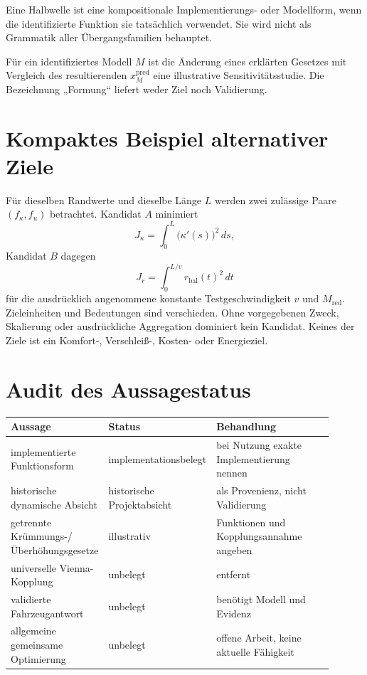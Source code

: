 \begin{definition}[Halbwelleninterpretation]
\label{def:half-wave-interpretation}
Eine Halbwelle ist eine kompositionale Implementierungs- oder Modellform,
wenn die identifizierte Funktion sie tatsächlich verwendet. Sie wird nicht
als Grammatik aller Übergangsfamilien behauptet.
\end{definition}

\begin{definition}
\label{def:dynamic-state-shaping}
Für ein identifiziertes Modell \(M\) ist die Änderung eines erklärten Gesetzes
mit Vergleich des resultierenden \(x_M^{\mathrm{pred}}\) eine illustrative
Sensitivitätsstudie. Die Bezeichnung „Formung“ liefert weder Ziel noch
Validierung.
\end{definition}

\section{Kompaktes Beispiel alternativer Ziele}

Für dieselben Randwerte und dieselbe Länge \(L\) werden zwei zulässige Paare
\((f_\kappa,f_u)\) betrachtet. Kandidat \(A\) minimiert
\[
J_\kappa=\int_0^L \bigl(\kappa'(s)\bigr)^2\,ds,
\]
Kandidat \(B\) dagegen
\[
J_r=\int_0^{L/v} r_{\mathrm{bal}}(t)^2\,dt
\]
für die ausdrücklich angenommene konstante Testgeschwindigkeit \(v\) und
\(M_{\mathrm{red}}\). Zieleinheiten und Bedeutungen sind verschieden. Ohne
vorgegebenen Zweck, Skalierung oder ausdrückliche Aggregation dominiert kein
Kandidat. Keines der Ziele ist ein Komfort-, Verschleiß-, Kosten- oder
Energieziel.

\section{Audit des Aussagestatus}

\begin{center}
\small
\begin{tabular}{p{0.29\linewidth}p{0.23\linewidth}p{0.38\linewidth}}
\toprule
Aussage & Status & Behandlung\\
\midrule
implementierte Funktionsform & implementationsbelegt & bei Nutzung exakte Implementierung nennen\\
historische dynamische Absicht & historische Projektabsicht & als Provenienz, nicht Validierung\\
getrennte Krümmungs-/Überhöhungsgesetze & illustrativ & Funktionen und Kopplungsannahme angeben\\
universelle Vienna-Kopplung & unbelegt & entfernt\\
validierte Fahrzeugantwort & unbelegt & benötigt Modell und Evidenz\\
allgemeine gemeinsame Optimierung & unbelegt & offene Arbeit, keine aktuelle Fähigkeit\\
\bottomrule
\end{tabular}
\end{center}

